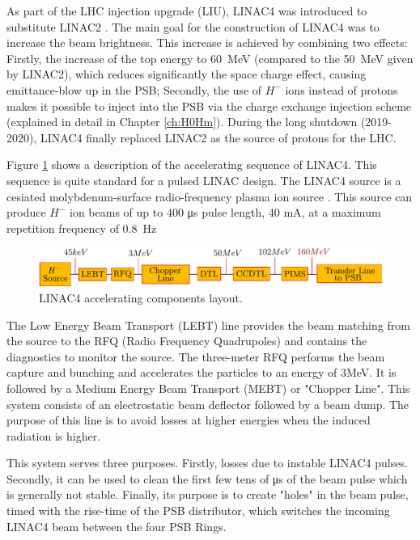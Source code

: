 As part of the LHC injection upgrade (LIU), LINAC4 was introduced to substitute LINAC2  \parencite*[]{ref:LIU}. The main goal for the construction of LINAC4 was to increase the beam brightness. This increase is achieved by combining two effects: Firstly, the increase of the top energy to \SIlist[]{60}{\mega \electronvolt} (compared to the \SI[]{50}{\mega \electronvolt} given by LINAC2), which reduces significantly the space charge effect, causing emittance-blow up in the PSB; Secondly, the use of $H^{-}$ ions instead of protons makes it possible to inject into the PSB via the charge exchange injection scheme (explained in detail in Chapter \ref{ch:H0Hm}). During the long shutdown (2019-2020), LINAC4 finally replaced LINAC2 as the source of protons for the LHC. 

Figure \ref{fig:Linac4_acc} shows a description of the accelerating sequence of LINAC4. This sequence is quite standard for a pulsed LINAC design. The LINAC4 source is a cesiated molybdenum-surface radio-frequency plasma ion source \parencite*[][]{ref:SourceCite}. This source can produce $H^{-}$ ion beams of up to 400 \si[]{\micro \second} pulse length, 40 \si[]{\milli \ampere}, at a maximum repetition frequency of \SI[]{0.8}{\hertz}

\begin{figure}[h]
    \centering
    \includegraphics[width=1.0\columnwidth]{Linac4_AcceleratingPart/Linac4_acc.pdf}
    \caption{LINAC4 accelerating components layout. }
    \label{fig:Linac4_acc}
\end{figure}

The Low Energy Beam Transport (LEBT) line provides the beam matching from the source to the RFQ (Radio Frequency Quadrupoles) and contains the diagnostics to monitor the source. The three-meter RFQ performs the beam capture and bunching and accelerates the particles to an energy of 3\si[]{\mega \electronvolt}. It is followed by a Medium Energy Beam Transport (MEBT) or "Chopper Line". This system consists of an electrostatic beam deflector followed by a beam dump. The purpose of this line is to avoid losses at higher energies when the induced radiation is higher.

This system serves three purposes. Firstly, losses due to instable LINAC4 pulses. Secondly, it can be used to clean the first few tens of \si[]{\micro \second} of the beam pulse which is generally not stable. Finally, its purpose is to create "holes" in the beam pulse, timed with the rise-time of the PSB distributor, which switches the incoming LINAC4 beam between the four PSB Rings.  

